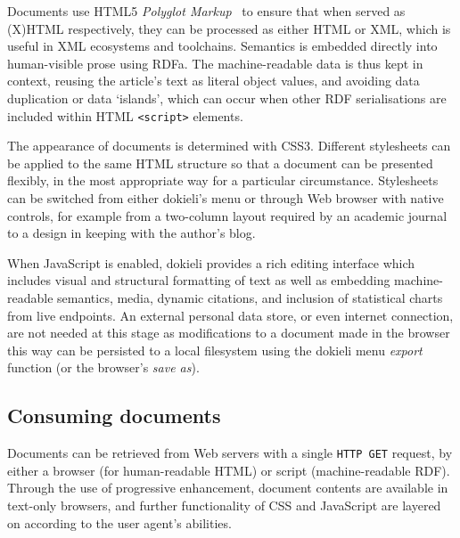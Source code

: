 \documentclass[a4paper]{llncs}
\begin{document}
                                
                                    
\par Documents use HTML5 \textit{Polyglot Markup}~\cite{ref-11} to ensure that when served as (X)HTML respectively, they can be processed as either HTML or XML, which is useful in XML ecosystems and toolchains. Semantics is embedded directly into human-visible prose using RDFa. The machine-readable data is thus kept in context, reusing the article’s text as literal object values, and avoiding data duplication or data ‘islands’, which can occur when other RDF serialisations are included within HTML {\tt <script>} elements.
                                    

                                    
\par The appearance of documents is determined with CSS3. Different stylesheets can be applied to the same HTML structure so that a document can be presented flexibly, in the most appropriate way for a particular circumstance. Stylesheets can be switched from either dokieli’s menu or through Web browser with native controls, for example from a two-column layout required by an academic journal to a design in keeping with the author’s blog.

                                    
\par When JavaScript is enabled, dokieli provides a rich editing interface which includes visual and structural formatting of text as well as embedding machine-readable semantics, media, dynamic citations, and inclusion of statistical charts from live endpoints. An external personal data store, or even internet connection, are not needed at this stage as modifications to a document made in the browser this way can be persisted to a local filesystem using the dokieli menu \textit{export} function (or the browser’s \textit{save as}).
                                
                            

                            
                                \subsection{Consuming documents}
  \label{consuming-documents}

                                
                                    
\par Documents can be retrieved from Web servers with a single {\tt HTTP GET} request, by either a browser (for human-readable HTML) or script (machine-readable RDF). Through the use of progressive enhancement, document contents are available in text-only browsers, and further functionality of CSS and JavaScript are layered on according to the user agent’s abilities.
\end{document}

